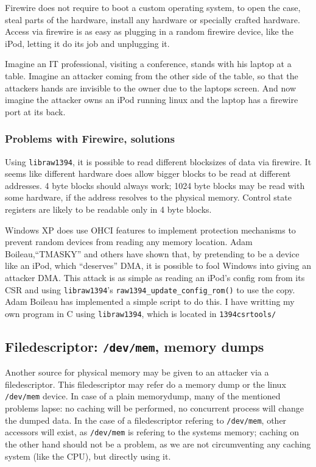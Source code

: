 Firewire does not require to boot a custom operating system, to open the case,
steal parts of the hardware, install any hardware or specially crafted hardware.
Access via firewire is as easy as plugging in a random firewire device, like the
iPod, letting it do its job and unplugging it.

Imagine an IT professional, visiting a conference, stands with his laptop at a
table.  Imagine an attacker coming from the other side of the table, so that the
attackers hands are invisible to the owner due to the laptops screen. And now
imagine the attacker owns an iPod running linux and the laptop has a firewire
port at its back.



\subsubsection{Problems with Firewire, solutions}

Using \texttt{libraw1394}, it is possible to read different blocksizes of data
via firewire.  It seems like different hardware does allow bigger blocks to be
read at different addresses. 4 byte blocks should always work; 1024 byte blocks
may be read with some hardware, if the address resolves to the physical memory.
Control state registers are likely to be readable only in 4 byte blocks.

\label{windows-dma} Windows XP does use OHCI features to implement protection
mechanisms to prevent random devices from reading any memory location.  Adam
Boileau,``TMASKY'' and others have shown \cite{rux2k6firewire:2006} that, by
pretending to be a device like an iPod, which ``deserves'' DMA, it is possible
to fool Windows into giving an attacker DMA.  This attack is as simple as
reading an iPod's config rom from its CSR and using \texttt{libraw1394}'s
\texttt{raw1394\_update\_config\_rom()} to use the copy.  Adam Boileau has
implemented a simple script to do this. I have writting my own program in C
using \texttt{libraw1394}, which is located in \texttt{1394csrtools/}



\subsection{Filedescriptor: \texttt{/dev/mem}, memory dumps}

Another source for physical memory may be given to an attacker via a
filedescriptor. This filedescriptor may refer do a memory dump or the linux
\texttt{/dev/mem} device. In case of a plain memorydump, many of the mentioned
problems lapse: no caching will be performed, no concurrent process will change
the dumped data. In the case of a filedescriptor refering to \texttt{/dev/mem},
other accessors will exist, as \texttt{/dev/mem} is refering to the systems
memory; caching on the other hand should not be a problem, as we are not
circumventing any caching system (like the CPU), but directly using it.

